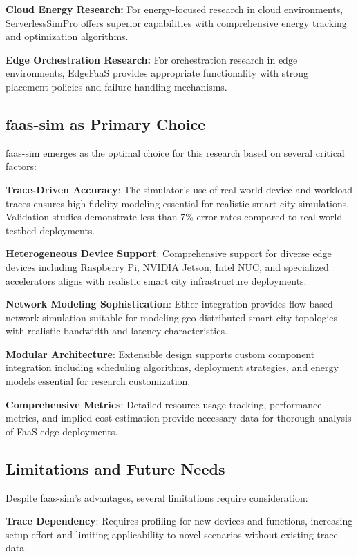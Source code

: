 \textbf{Cloud Energy Research:} For energy-focused research in cloud environments, ServerlessSimPro offers superior capabilities with comprehensive energy tracking and optimization algorithms.

\textbf{Edge Orchestration Research:} For orchestration research in edge environments, EdgeFaaS provides appropriate functionality with strong placement policies and failure handling mechanisms.

\subsection{faas-sim as Primary Choice}

faas-sim emerges as the optimal choice for this research based on several critical factors:

\textbf{Trace-Driven Accuracy}: The simulator's use of real-world device and workload traces ensures high-fidelity modeling essential for realistic smart city simulations. Validation studies demonstrate less than 7\% error rates compared to real-world testbed deployments.

\textbf{Heterogeneous Device Support}: Comprehensive support for diverse edge devices including Raspberry Pi, NVIDIA Jetson, Intel NUC, and specialized accelerators aligns with realistic smart city infrastructure deployments.

\textbf{Network Modeling Sophistication}: Ether \cite{rausch2020ether}  integration provides flow-based network simulation suitable for modeling geo-distributed smart city topologies with realistic bandwidth and latency characteristics.

\textbf{Modular Architecture}: Extensible design supports custom component integration including scheduling algorithms, deployment strategies, and energy models essential for research customization.

\textbf{Comprehensive Metrics}: Detailed resource usage tracking, performance metrics, and implied cost estimation provide necessary data for thorough analysis of FaaS-edge deployments.

\subsection{Limitations and Future Needs}

Despite faas-sim's advantages, several limitations require consideration:

\textbf{Trace Dependency}: Requires profiling for new devices and functions, increasing setup effort and limiting applicability to novel scenarios without existing trace data.

